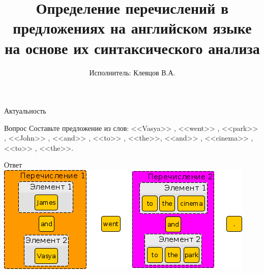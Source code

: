 \documentclass[10pt,ps,serif,mathserif]{beamer}
\begin{document}
\def\labelenumi{\theenumi}
\def\labelenumii{\theenumii}
\def\labelitemi{\theenumi}
\renewcommand{\theenumi}{\arabic{enumi}}
\renewcommand{\labelenumi}{\theenumi)}
\renewcommand{\theenumii}{\alph{enumii}}
\renewcommand{\labelenumii}{\arabic{enumi}.\arabic{enumii}}
\renewcommand{\labelitemi}{$\bullet$}


\title[Определение перечислений на английском языке]{Определение перечислений в предложениях на английском языке на основе их синтаксического анализа}
\author[Клевцов В.А.]{Исполнитель: Клевцов В.А.}
\date{}
    \begin{frame}
        \titlepage
    \end{frame}
    \begin{frame}{Актуальность}
        \begin{block}{Вопрос}
        Составьте предложение из слов: <<Vasya>> , <<went>> , <<park>> , <<John>> , <<and>> , <<to>> , <<the>>, <<and>> , <<cinema>> , <<to>> , <<the>>.
        \end{block}
        \begin{block}{Ответ}
        \includegraphics[width=\textwidth]{images/answer.png}
        \end{block}
    \end{frame}
\end{document}

